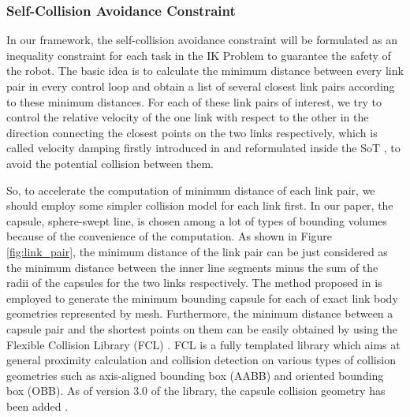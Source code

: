 
\subsubsection{Self-Collision Avoidance Constraint}
\label{sec:collision_avoidance}
In our framework, the self-collision avoidance constraint will be formulated as an inequality constraint for each task in the IK Problem to guarantee the safety of the robot. The basic idea is to calculate the minimum distance between every link pair in every control loop and obtain a list of several closest link pairs according to these minimum distances. For each of these link pairs of interest, we try to control the relative velocity of the one link with respect to the other in the direction connecting the closest points on the two links respectively, which is called velocity damping firstly introduced in \cite{1087982} and reformulated inside the SoT \cite{kanehiro2008local}, to avoid the potential collision between them. 

So, to accelerate the computation of minimum distance of each link pair, we should employ some simpler collision model for each link first. In our paper, the capsule, sphere-swept line, is chosen among a lot of types of bounding volumes because of the convenience of the computation. As shown in Figure \ref{fig:link_pair}, the minimum distance of the link pair can be just considered as the minimum distance between the inner line segments minus the sum of the radii of the capsules for the two links respectively. The method proposed in \cite{el_khoury2013-rp} is employed to generate the minimum bounding capsule for each of exact link body geometries represented by mesh. Furthermore, the minimum distance between a capsule pair and the shortest points on them can be easily obtained by using the Flexible Collision Library (FCL) \cite{6225337}. FCL is a fully templated library which aims at general proximity calculation and collision detection on various types of collision geometries such as axis-aligned bounding box (AABB) and oriented bounding box (OBB). As of version $3.0$ of the library, the capsule collision geometry has been added \cite{knese2014msc}.  

